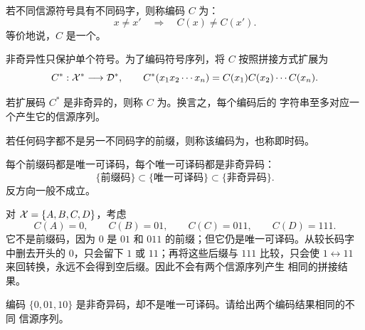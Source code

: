 
\begin{definition}[非奇异码]\label{def:nonsingular}
若不同信源符号具有不同码字，则称编码 $C$ 为：
\[
  x\ne x'\quad\Longrightarrow\quad C(x)\ne C(x').
\]
等价地说，$C$ 是一个。
\end{definition}

非奇异性只保护单个符号。为了编码符号序列，将 $C$ 按照拼接方式扩展为
\[
  C^*:\mathcal{X}^*\longrightarrow\mathcal{D}^*,\qquad
  C^*(x_1x_2\cdots x_n)=C(x_1)C(x_2)\cdots C(x_n).
\]

\begin{definition}[唯一可译码]\label{def:ud}
若扩展码 $C^*$ 是非奇异的，则称 $C$ 为。换言之，每个编码后的
字符串至多对应一个产生它的信源序列。
\end{definition}

\begin{definition}[前缀码]\label{def:prefix}
若任何码字都不是另一不同码字的前缀，则称该编码为，也称即时码。
\end{definition}

每个前缀码都是唯一可译码，每个唯一可译码都是非奇异码：
\[
  \{\text{前缀码}\}
  \subset
  \{\text{唯一可译码}\}
  \subset
  \{\text{非奇异码}\}.
\]
反方向一般不成立。

\begin{example}[唯一可译但不是前缀码]\label{ex:ud-not-prefix}
对 $\mathcal{X}=\{A,B,C,D\}$，考虑
\[
  C(A)=0,\qquad C(B)=01,\qquad C(C)=011,\qquad C(D)=111.
\]
它不是前缀码，因为 $0$ 是 $01$ 和 $011$ 的前缀；但它仍是唯一可译码。从较长码字
中删去开头的 $0$，只会留下 $1$ 或 $11$；再将这些后缀与 $111$ 比较，只会使
$1\leftrightarrow11$ 来回转换，永远不会得到空后缀。因此不会有两个信源序列产生
相同的拼接结果。
\end{example}

\begin{yourturn}
编码 $\{0,01,10\}$ 是非奇异码，却不是唯一可译码。请给出两个编码结果相同的不同
信源序列。
\ifshowanswers\else\workspace[1]\fi
{}
\end{yourturn}

\vspace{1.2cm}

